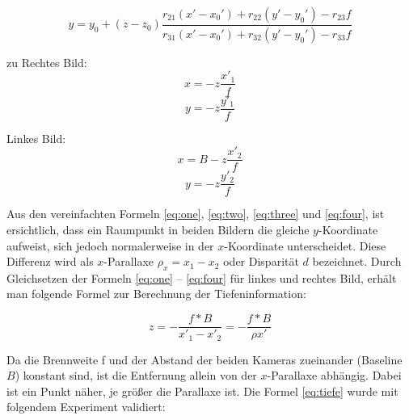 \begin{equation}
y = y_{0} + (z - z_{0})\frac
{r_{21}(x'-x_{0}') + r_{22}(y'-y_{0}')-r_{23}f}
{r_{31}(x'-x_{0}') + r_{32}(y'-y_{0}')-r_{33}f}
\end{equation}

\noindent zu\newline
\noindent Rechtes Bild:
\begin{equation}\label{eq:one}
x = -z \frac{x'_{1}}{f}
\end{equation}
\begin{equation}\label{eq:two}
y = -z \frac{y'_{1}}{f}
\end{equation}

\noindent Linkes Bild:
\begin{equation}\label{eq:three}
x = B-z \frac{x'_{2}}{f}
\end{equation}
\begin{equation}\label{eq:four}
y = -z \frac{y'_{2}}{f}
\end{equation}

\noindent Aus den vereinfachten Formeln \ref{eq:one}, \ref{eq:two}, \ref{eq:three} und \ref{eq:four}, ist ersichtlich, dass ein Raumpunkt in beiden Bildern die gleiche $y$-Koordinate aufweist, sich jedoch normalerweise in der $x$-Koordinate unterscheidet. Diese Differenz wird als $x$-Parallaxe 
$\rho_{x} = x_{1} - x_{2}$ oder Disparität $d$ bezeichnet.\newline
\noindent Durch Gleichsetzen der Formeln \ref{eq:one} – \ref{eq:four} für linkes und rechtes Bild, erhält man folgende Formel zur Berechnung der Tiefeninformation:

\begin{equation}\label{eq:tiefe}
z = -\frac
{f*B}
{x'_{1}-x'_{2}}
=
-\frac
{f*B}
{\rho x'}
\end{equation}

\noindent Da die Brennweite f und der Abstand der beiden Kameras zueinander (Baseline $B$) konstant sind, ist die Entfernung allein von der $x$-Parallaxe abhängig. Dabei ist ein Punkt näher, je größer die Parallaxe ist. \newline
Die Formel \ref{eq:tiefe} wurde mit folgendem Experiment validiert:


